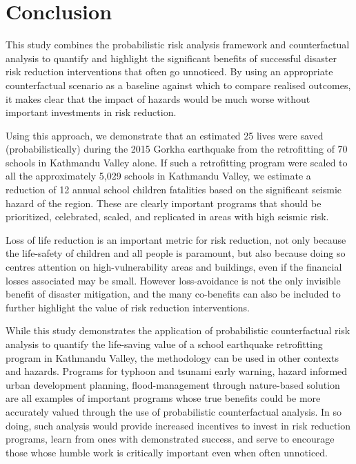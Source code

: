 \section{Conclusion}
\label{section-conclusion}

This study combines the probabilistic risk analysis framework and counterfactual analysis to quantify and highlight the significant benefits of successful disaster risk reduction interventions that often go unnoticed. By using an appropriate counterfactual scenario as a baseline against which to compare realised outcomes, it makes clear that the impact of hazards would be much worse without important investments in risk reduction.

Using this approach, we demonstrate that an estimated 25 lives were saved (probabilistically) during the 2015 Gorkha earthquake from the retrofitting of 70 schools in Kathmandu Valley alone. If such a retrofitting program were scaled to all the approximately 5,029 schools in Kathmandu Valley, we estimate a reduction of 12 annual school children fatalities based on the significant seismic hazard of the region. These are clearly important programs that should be prioritized, celebrated, scaled, and replicated in areas with high seismic risk.

Loss of life reduction is an important metric for risk reduction, not only because the life-safety of children and all people is paramount, but also because doing so centres attention on high-vulnerability areas and buildings, even if the financial losses associated may be small. However loss-avoidance is not the only invisible benefit of disaster mitigation, and the many co-benefits can also be included to further highlight the value of risk reduction interventions.

While this study demonstrates the application of probabilistic counterfactual risk analysis to quantify the life-saving value of a school earthquake retrofitting program in Kathmandu Valley, the methodology can be used in other contexts and hazards. Programs for typhoon and tsunami early warning, hazard informed urban development planning, flood-management through nature-based solution are all examples of important programs whose true benefits could be more accurately valued through the use of probabilistic counterfactual analysis. In so doing, such analysis would provide increased incentives to invest in risk reduction programs, learn from ones with demonstrated success, and serve to encourage those whose humble work is critically important even when often unnoticed.


